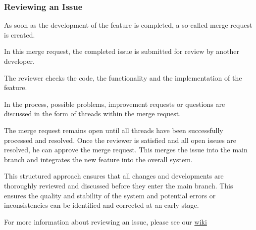 \documentclass[12pt]{article}
\begin{document}
\subsubsection{Reviewing an Issue}
\begin{minipage}[t]{0.51\textwidth}
As soon as the development of the feature is completed, a so-called merge request is created.

In this merge request, the completed issue is submitted for review by another developer. 

The reviewer checks the code, the functionality and the implementation of the feature. 

In the process, possible problems, improvement requests or questions are discussed in the form of threads within the merge request.

The merge request remains open until all threads have been successfully processed and resolved. Once the reviewer is satisfied and all open issues are resolved, he can approve the merge request. This merges the issue into the main branch and integrates the new feature into the overall system.

This structured approach ensures that all changes and developments are thoroughly reviewed and discussed before they enter the main branch. This ensures the quality and stability of the system and potential errors or inconsistencies can be identified and corrected at an early stage.

For more information about reviewing an issue, please see our \href{https://gitlab.uni-ulm.de/groups/se-anwendungsprojekt-22-23/-/wikis/Convention#review-process}{wiki}

\end{minipage} 
\hfill
\end{document}
